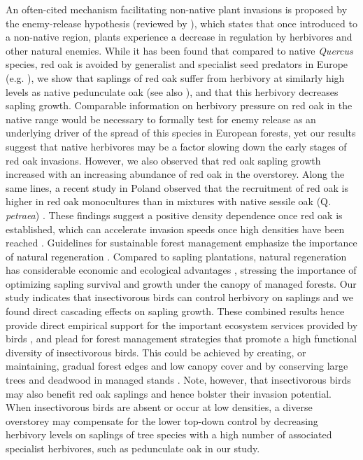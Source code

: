\documentclass[10pt, twoside]{book} %
\begin{document}
	An often-cited mechanism facilitating non-native plant invasions is proposed by the enemy-release hypothesis (reviewed by \citealt{Liu2006}), which states that once introduced to a non-native region, plants experience a decrease in regulation by herbivores and other natural enemies. While it has been found that compared to native \textit{Quercus} species, red oak is avoided by generalist and specialist seed predators in Europe (e.g. \citealt{Myczko2014, Bogdziewicz2018}), we show that saplings of red oak suffer from herbivory at similarly high levels as native pedunculate oak (see also \citealt{Wein2016, VanSchrojensteinLantman2018}), and that this herbivory decreases sapling growth. Comparable information on herbivory pressure on red oak in the native range would be necessary to formally test for enemy release as an underlying driver of the spread of this species in European forests, yet our results suggest that native herbivores may be a factor slowing down the early stages of red oak invasions. However, we also observed that red oak sapling growth increased with an increasing abundance of red oak in the overstorey. Along the same lines, a recent study in Poland observed that the recruitment of red oak is higher in red oak monocultures than in mixtures with native sessile oak (Q\textit{. petraea}) \citep{Bogdziewicz2019}. These findings suggest a positive density dependence once red oak is established, which can accelerate invasion speeds once high densities have been reached \citep{Brooker2007}. 
	Guidelines for sustainable forest management emphasize the importance of natural regeneration \citep{DenOuden2010}. Compared to sapling plantations, natural regeneration has considerable economic and ecological advantages \citep{Burgi2003, Vranckx2014}, stressing the importance of optimizing sapling survival and growth under the canopy of managed forests. Our study indicates that insectivorous birds can control herbivory on saplings and we found direct cascading effects on sapling growth. These combined results hence provide direct empirical support for the important ecosystem services provided by birds \citep{Sekercioglu2012}, and plead for forest management strategies that promote a high functional diversity of insectivorous birds. This could be achieved by creating, or maintaining, gradual forest edges \citep{Melin2018, Terraube2016} and low canopy cover and by conserving large trees and deadwood in managed stands \citep{Bereczki2014, Penone2019}. Note, however, that insectivorous birds may also benefit red oak saplings and hence bolster their invasion potential. When insectivorous birds are absent or occur at low densities, a diverse overstorey may compensate for the lower top-down control by decreasing herbivory levels on saplings of tree species with a high number of associated specialist herbivores, such as pedunculate oak in our study.\\
	
\end{document}
